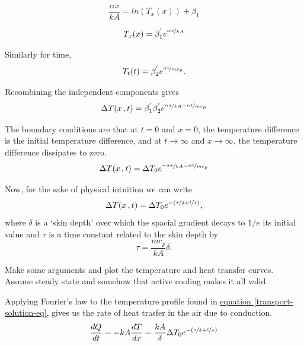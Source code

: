 \documentclass[10pt, twocolumn]{article}
\begin{document}
\begin{equation*}
\frac{\alpha x}{kA}=ln\left(T_{x}(x)\right)+\beta_{1}
\end{equation*}

\begin{equation*}
T_{x}(x)=\beta_{1}^{'}e^{\nicefrac{\alpha x}{kA}}
\end{equation*}

Similarly for time,
\begin{equation*}
T_{t}(t)=\beta_{2}^{'}e^{\nicefrac{\alpha t}{mc_{p}}}.
\end{equation*}

Recombining the independent components gives
\begin{equation*}
\Delta T(x\,,t)=\beta_{1}^{'}\beta_{2}^{'}e^{\nicefrac{\alpha x}{kA}+\nicefrac{\alpha t}{mc_{p}}}
\end{equation*}

The boundary conditions are that at $t=0$ and $x=0$, the temperature difference is
the initial temperature difference, and at $t\rightarrow\infty$ and $x\rightarrow\infty$,
the temperature difference dissipates to zero.
\begin{equation*}
\Delta T(x\,,t)=\Delta T_{0}e^{\nicefrac{-\alpha x}{kA}-\nicefrac{\alpha t}{mc_{p}}}
\end{equation*}

Now, for the sake of physical intuition we can write
\begin{equation}
\Delta T(x\,,t)=\Delta T_{0}e^{-(\nicefrac{x}{\delta}+\nicefrac{t}{\tau})},
\label{transport-solution-eq}
\end{equation}
where $\delta$ is a `skin depth' over which the spacial gradient decays to $1/e$ its
initial value and $\tau$ is a time constant related to the skin depth by
\begin{equation}
\tau=\frac{mc_{p}}{kA}\delta.
\label{transport-time-constant-eq}
\end{equation}

Make some arguments and plot the temperature and heat transfer curves.
Assume steady state and somehow that active cooling makes it all valid.

Applying Fourier's law to the temperature profile found in
\hyperref[transport-solution-eq]{equation \ref{transport-solution-eq}},
gives us the rate of heat trasfer in the air due to conduction.
\begin{equation*}
\frac{dQ}{dt}=-kA\frac{dT}{dx}=
\frac{kA}{\delta}\Delta T_{0}e^{-(\nicefrac{x}{\delta}+\nicefrac{t}{\tau})}
\end{equation*}
\end{document}
